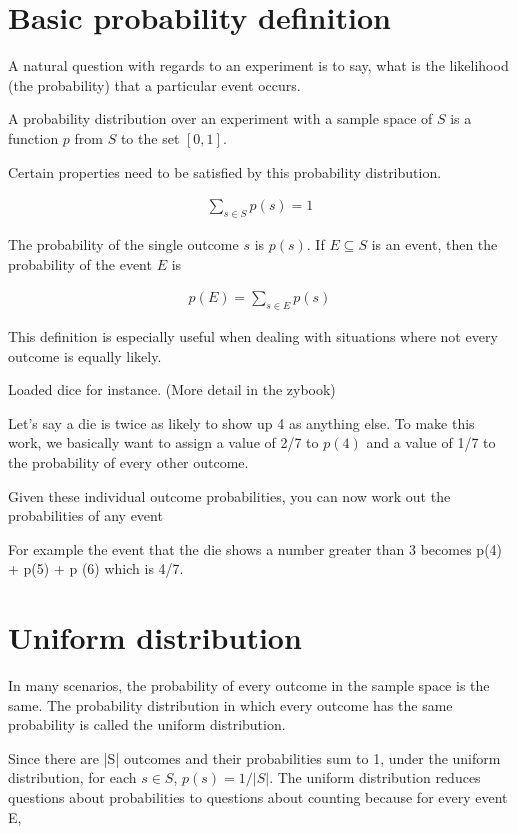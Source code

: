 \documentclass[12pt]{article}
\begin{document}
\section*{Basic probability definition}
A natural question with regards to an experiment is to say, what is the likelihood (the probability) that a particular event occurs.

A probability distribution over an experiment with a sample space of $S$ is a function $p$ from $S$ to the set $[0,1]$.

Certain properties need to be satisfied by this probability distribution.

\begin{align*}
\sum_{s \in S} p(s) = 1
\end{align*}

The probability of the single outcome $s$ is $p(s)$. If $E \subseteq S$ is an event, then the probability of the event $E$ is  

\begin{align*}
p(E) = \sum_{s \in E} p(s) 
\end{align*}

This definition is especially useful when dealing with situations where not every outcome is equally likely. 

Loaded dice for instance. (More detail in the zybook)

Let's say a die is twice as likely to show up 4 as anything else. To make this work, we basically want to assign a value of 2/7 to $p(4)$ and a value of 1/7 to the probability of every other outcome.

Given these individual outcome probabilities, you can now work out the probabilities of any event

For example the event that the die shows a number greater than 3 becomes p(4) + p(5) + p (6) which is 4/7.

\section*{Uniform distribution}

In many scenarios, the probability of every outcome in the sample space is the same. The probability distribution in which every outcome has the same probability is called the uniform distribution. 

Since there are |S| outcomes and their probabilities sum to 1, under the uniform distribution, for each $s \in S$, $p(s) = 1/|S|$. The uniform distribution reduces questions about probabilities to questions about counting because for every event E,
\end{document}

